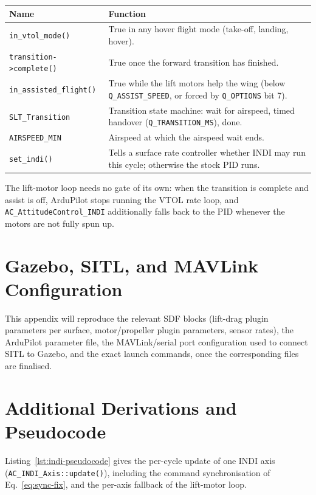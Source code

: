 \documentclass{article}
\begin{document}
\begin{longtable}{p{}p{}}
\textbf{Name} & \textbf{Function} \\
\midrule
\texttt{in\_vtol\_mode()} & True in any hover flight mode (take-off, landing, hover). \\
\texttt{transition->complete()} & True once the forward transition has finished. \\
\texttt{in\_assisted\_flight()} & True while the lift motors help the wing (below \texttt{Q\_ASSIST\_SPEED}, or forced by \texttt{Q\_OPTIONS} bit 7). \\
\texttt{SLT\_Transition} & Transition state machine: wait for airspeed, timed handover (\texttt{Q\_TRANSITION\_MS}), done. \\
\texttt{AIRSPEED\_MIN} & Airspeed at which the airspeed wait ends. \\
\texttt{set\_indi()} & Tells a surface rate controller whether INDI may run this cycle; otherwise the stock PID runs. \\
\end{longtable}

The lift-motor loop needs no gate of its own: when the transition is complete and assist is off, ArduPilot stops running the VTOL rate loop, and \texttt{AC\_AttitudeControl\_INDI} additionally falls back to the PID whenever the motors are not fully spun up.

\section{Gazebo, SITL, and MAVLink Configuration}
\label{sec:appendix-config}
This appendix will reproduce the relevant SDF blocks (lift-drag plugin parameters per surface, motor/propeller plugin parameters, sensor rates), the ArduPilot parameter file, the MAVLink/serial port configuration used to connect SITL to Gazebo, and the exact launch commands, once the corresponding files are finalised.

\section{Additional Derivations and Pseudocode}
\label{sec:appendix-derivations}
Listing~\ref{lst:indi-pseudocode} gives the per-cycle update of one INDI axis (\texttt{AC\_INDI\_Axis::update()}), including the command synchronisation of Eq.~\eqref{eq:sync-fix}, and the per-axis fallback of the lift-motor loop.
\end{document}
